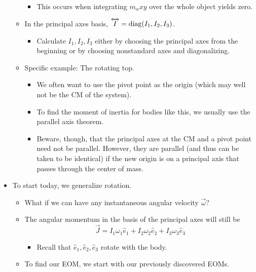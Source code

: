 \documentclass[../notes.tex]{subfiles}
\begin{document}
\begin{itemize}
\begin{itemize}
        \begin{itemize}
            \item This occurs when integrating $m_\alpha xy$ over the whole object yields zero.
        \end{itemize}
        \item In the principal axes basis, $\overleftrightarrow{I}=\operatorname{diag}(I_1,I_2,I_3)$.
        \begin{itemize}
            \item Calculate $I_1,I_2,I_3$ either by choosing the principal axes from the beginning or by choosing nonstandard axes and diagonalizing.
        \end{itemize}
        \item Specific example: The rotating top.
        \begin{itemize}
            \item We often want to use the pivot point as the origin (which may well not be the CM of the system).
            \item To find the moment of inertia for bodies like this, we usually use the parallel axis theorem.
            \item Beware, though, that the principal axes at the CM and a pivot point need not be parallel. However, they are parallel (and thus can be taken to be identical) if the new origin is on a principal axis that passes through the center of mass.
        \end{itemize}
    \end{itemize}
    \item To start today, we generalize rotation.
    \begin{itemize}
        \item What if we can have any instantaneous angular velocity $\vec{\omega}$?
        \item The angular momentum in the basis of the principal axes will still be
        \begin{equation*}
            \vec{J} = I_1\omega_1\hat{e}_1+I_2\omega_2\hat{e}_2+I_3\omega_3\hat{e}_3
        \end{equation*}
        \begin{itemize}
            \item Recall that $\hat{e}_1,\hat{e}_2,\hat{e}_3$ rotate with the body.
        \end{itemize}
        \item To find our EOM, we start with our previously discovered EOMs.
        \begin{equation*}

\end{equation*}
\end{itemize}
\end{itemize}
\end{document}
